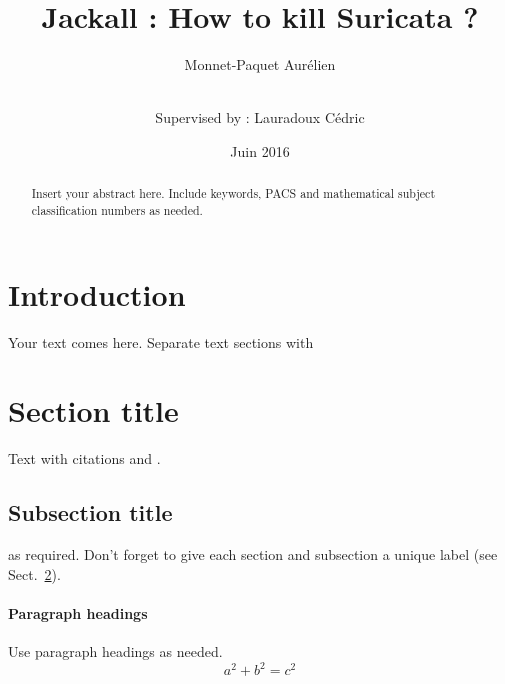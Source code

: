 \documentclass[smallextended]{svjour3}       %
\begin{document}
\title{Jackall : How to kill Suricata ?}


\author{Monnet-Paquet Aurélien  \\ \and \\
        Supervised by : Lauradoux Cédric
}



\date{Juin 2016}


\maketitle

\begin{abstract}
Insert your abstract here. Include keywords, PACS and mathematical
subject classification numbers as needed.
\end{abstract}

\section{Introduction}
\label{intro}
Your text comes here. Separate text sections with
\section{Section title}
\label{sec:1}
Text with citations \cite{RefB} and \cite{RefJ}.
\subsection{Subsection title}
\label{sec:2}
as required. Don't forget to give each section
and subsection a unique label (see Sect.~\ref{sec:1}).
\paragraph{Paragraph headings} Use paragraph headings as needed.
\begin{equation}
a^2+b^2=c^2
\end{equation}
\end{document}
